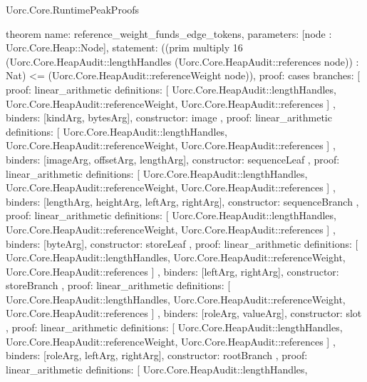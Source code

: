 \begin{lexlean}{Uorc.Core.RuntimePeakProofs}
\begin{semanticmodule}
theorem{
  name: reference_weight_funds_edge_tokens,
  parameters: [node : Uorc.Core.Heap::Node],
  statement: ((prim multiply 16 (Uorc.Core.HeapAudit::lengthHandles (Uorc.Core.HeapAudit::references node)) : Nat) <= (Uorc.Core.HeapAudit::referenceWeight node)),
  proof: cases{
    branches: [
      {
        proof: linear_arithmetic{
          definitions: [
            Uorc.Core.HeapAudit::lengthHandles,
            Uorc.Core.HeapAudit::referenceWeight,
            Uorc.Core.HeapAudit::references
          ]
        },
        binders: [kindArg, bytesArg],
        constructor: image
      },
      {
        proof: linear_arithmetic{
          definitions: [
            Uorc.Core.HeapAudit::lengthHandles,
            Uorc.Core.HeapAudit::referenceWeight,
            Uorc.Core.HeapAudit::references
          ]
        },
        binders: [imageArg, offsetArg, lengthArg],
        constructor: sequenceLeaf
      },
      {
        proof: linear_arithmetic{
          definitions: [
            Uorc.Core.HeapAudit::lengthHandles,
            Uorc.Core.HeapAudit::referenceWeight,
            Uorc.Core.HeapAudit::references
          ]
        },
        binders: [lengthArg, heightArg, leftArg, rightArg],
        constructor: sequenceBranch
      },
      {
        proof: linear_arithmetic{
          definitions: [
            Uorc.Core.HeapAudit::lengthHandles,
            Uorc.Core.HeapAudit::referenceWeight,
            Uorc.Core.HeapAudit::references
          ]
        },
        binders: [byteArg],
        constructor: storeLeaf
      },
      {
        proof: linear_arithmetic{
          definitions: [
            Uorc.Core.HeapAudit::lengthHandles,
            Uorc.Core.HeapAudit::referenceWeight,
            Uorc.Core.HeapAudit::references
          ]
        },
        binders: [leftArg, rightArg],
        constructor: storeBranch
      },
      {
        proof: linear_arithmetic{
          definitions: [
            Uorc.Core.HeapAudit::lengthHandles,
            Uorc.Core.HeapAudit::referenceWeight,
            Uorc.Core.HeapAudit::references
          ]
        },
        binders: [roleArg, valueArg],
        constructor: slot
      },
      {
        proof: linear_arithmetic{
          definitions: [
            Uorc.Core.HeapAudit::lengthHandles,
            Uorc.Core.HeapAudit::referenceWeight,
            Uorc.Core.HeapAudit::references
          ]
        },
        binders: [roleArg, leftArg, rightArg],
        constructor: rootBranch
      },
      {
        proof: linear_arithmetic{
          definitions: [
            Uorc.Core.HeapAudit::lengthHandles,
}}}}
\end{semanticmodule}
\end{lexlean}
